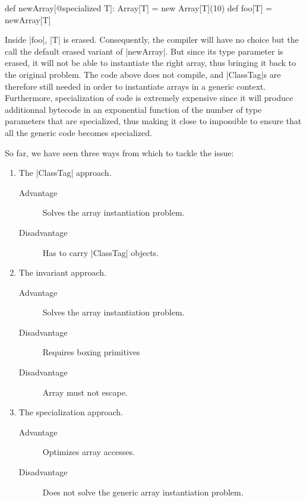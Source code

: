 \begin{lstlisting-nobreak}
 def newArray[@specialized T]: Array[T] = 
   new Array[T](10)
 def foo[T] = newArray[T]
\end{lstlisting-nobreak}

Inside |foo|, |T| is erased. Consequently, the compiler will have no choice but the call the default erased variant of |newArray|. But since its type parameter is erased, it will not be able to instantiate the right array, thus bringing it back to the original problem. The code above does not compile, and |ClassTag|s are therefore still needed in order to instantiate arrays in a generic context. Furthermore, specialization of code is extremely expensive since it will produce additionnal bytecode in an exponential function of the number of type parameters that are specialized, thus making it close to impossible to ensure that all the generic code becomes specialized.


So far, we have seen three ways from which to tackle the issue:

\begin{enumerate}
  \item The |ClassTag| approach.
    \begin{description}
      \item[Advantage] 	Solves the array instantiation problem.
      \item[Disadvantage] Has to carry |ClassTag| objects.
    \end{description}
  \item The invariant approach.
    \begin{description}
      \item[Advantage] 	Solves the array instantiation problem.
      \item[Disadvantage] Requires boxing primitives
      \item[Disadvantage] Array must not escape.
    \end{description}
  \item The specialization approach.
    \begin{description}
      \item[Advantage] 	Optimizes array accesses.
      \item[Disadvantage] Does not solve the generic array instantiation problem.
    \end{description}
\end{enumerate}

